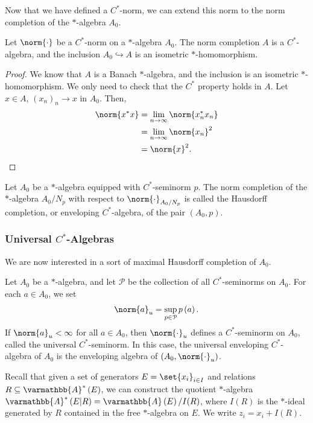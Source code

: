\documentclass[10pt]{mypackage}
\renewcommand*{\mathbb}[1]{\varmathbb{#1}}
\newcommand{\A}{\mathbb{A}}
\begin{document}
Now that we have defined a $C^{\ast}$-norm, we can extend this norm to the norm completion of the $\ast$-algebra $A_0$.
\begin{lemma}
  Let $\norm{\cdot}$ be a $C^{\ast}$-norm on a $\ast$-algebra $A_0$. The norm completion $A$ is a $C^{\ast}$-algebra, and the inclusion $A_0\hookrightarrow A$ is an isometric $\ast$-homomorphism.
\end{lemma}
\begin{proof}
  We know that $A$ is a Banach $\ast$-algebra, and the inclusion is an isometric $\ast$-homomorphism. We only need to check that the $C^{\ast}$ property holds in $A$. Let $x\in A$, $\left(x_n\right)_n\rightarrow x$ in $A_0$. Then,
  \begin{align*}
    \norm{x^{\ast}x} &= \lim_{n\rightarrow\infty}\norm{x_n^{\ast}x_n}\\
                     &= \lim_{n\rightarrow\infty}\norm{x_n}^2\\
                     &= \norm{x}^2.
  \end{align*}
\end{proof}
\begin{definition}
  Let $A_0$ be a $\ast$-algebra equipped with $C^{\ast}$-seminorm $p$. The norm completion of the $\ast$-algebra $A_0/N_p$ with respect to $\norm{\cdot}_{A_0/N_p}$ is called the Hausdorff completion, or enveloping $C^{\ast}$-algebra, of the pair $\left(A_0,p\right)$.
\end{definition}
\subsubsection{Universal $C^{\ast}$-Algebras}%
We are now interested in a sort of maximal Hausdorff completion of $A_0$.
\begin{definition}
  Let $A_0$ be a $\ast$-algebra, and let $\mathcal{P}$ be the collection of all $C^{\ast}$-seminorms on $A_0$. For each $a\in A_0$, we set
  \begin{align*}
    \norm{a}_u = \sup_{p\in \mathcal{P}}p\left(a\right).
  \end{align*}
  If $\norm{a}_u < \infty$ for all $a\in A_0$, then $\norm{\cdot}_{u}$ defines a $C^{\ast}$-seminorm on $A_0$, called the universal $C^{\ast}$-seminorm. In this case, the universal enveloping $C^{\ast}$-algebra of $A_0$ is the enveloping algebra of $\left(A_0,\norm{\cdot}_u\right)$.
\end{definition}
Recall that given a set of generators $E = \set{x_i}_{i\in I}$ and relations $R \subseteq \A^{\ast}\left(E\right)$, we can construct the quotient $\ast$-algebra $\A^{\ast}\left(E|R\right) = \A\left(E\right)/I(R)$, where $I(R)$ is the $\ast$-ideal generated by $R$ contained in the free $\ast$-algebra on $E$. We write $z_i = x_i + I(R)$.\newline
\end{document}
